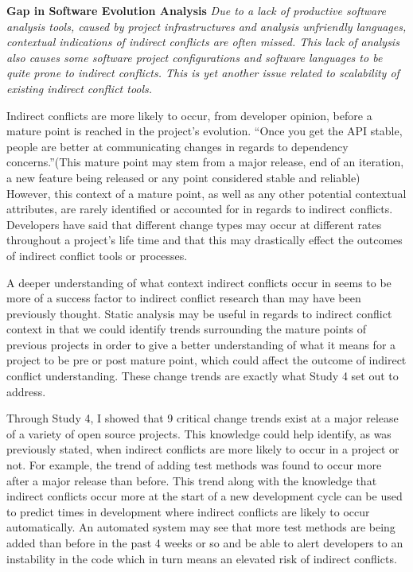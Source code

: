 \textbf{Gap in Software Evolution Analysis} \textit{Due to a lack of productive software analysis tools, caused by project infrastructures
and analysis unfriendly languages, contextual indications of indirect conflicts are often missed. This lack of analysis also causes
some software project configurations and software languages to be quite prone to indirect conflicts. This is yet another issue related
to scalability of existing indirect conflict tools.}

Indirect conflicts are more likely to occur,
from developer opinion, before a mature point is reached in the project's evolution. ``Once you get the API stable, people are 
better at communicating changes in regards to dependency concerns.''(This mature point may stem from a major release,
end of an iteration, a new feature being released or any point considered stable and reliable) However, this context of a 
mature point, as well as any other
potential contextual attributes, are rarely identified or accounted for in regards to indirect conflicts. Developers have said
that different change types may occur at different rates throughout a project's life time and that this
may drastically effect the outcomes of indirect conflict tools or processes.

A deeper understanding of what context indirect conflicts occur in seems to be more of a success factor to indirect conflict
research than may have been previously thought. Static analysis may be useful in regards to indirect conflict context in that we
could identify trends surrounding the mature points of previous projects in order to give a better understanding of what it
means for a project to be pre or post mature point, which could affect the outcome of indirect conflict understanding.
These change trends are exactly what Study 4 set out to address.

Through Study 4, I showed that 9 critical change trends exist at a major release of a variety of open source projects. This
knowledge could help identify, as was previously stated, when indirect conflicts are more likely to occur in a project or not.
For example, the trend of adding test methods was found to occur more after a major release than before. This trend along with
the knowledge that indirect conflicts occur more at the start of a new development cycle can be used to predict times in development
where indirect conflicts are likely to occur automatically. An automated system may see that more test methods are being added than
before in the past 4 weeks or so and be able to alert developers to an instability in the code which in turn means an elevated
risk of indirect conflicts.

